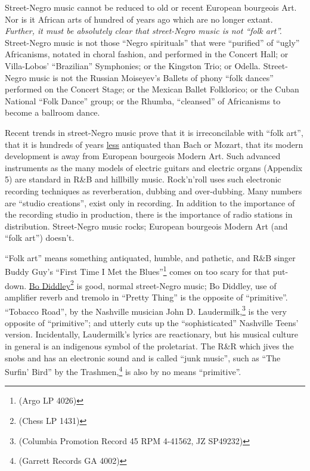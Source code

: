 Street-Negro music cannot be reduced to old or recent European bourgeois Art. 
Nor is it African arts of hundred of years ago which are no longer extant. 
\emph{Further, it must be absolutely clear that street-Negro music is not \enquote{folk art}.}
Street-Negro music is not those \enquote{Negro spirituals} that were \enquote{purified} of 
\enquote{ugly} Africanisms, notated in choral fashion, and performed in the Concert
Hall; or Villa-Lobos' \enquote{Brazilian} Symphonies; or the Kingston Trio; or Odella.
Street-Negro music is not the Russian Moiseyev's Ballets of phony \enquote{folk dances}
performed on the Concert Stage; or the Mexican Ballet Folklorico; or the Cuban
National \enquote{Folk Dance} group; or the Rhumba, \enquote{cleansed} of Africanisms to become
a ballroom dance. 

Recent trends in street-Negro music prove that it is irreconcilable 
with \enquote{folk art}, that it is hundreds of years \uline{less} antiquated than Bach or 
Mozart, that its modern development is away from European bourgeois Modern 
Art. Such advanced instruments as the many models of electric guitars and 
electric organs (Appendix 5) are standard in R\&B and hillbilly music. Rock'n'roll 
uses such electronic recording techniques as reverberation, dubbing
and over-dubbing. Many numbers are \enquote{studio creations}, exist only in recording.
In addition to the importance of the recording studio in production, there 
is the importance of radio stations in distribution. Street-Negro music rocks;
European bourgeois Modern Art (and \enquote{folk art}) doesn't. 

\enquote{Folk art} means something antiquated, humble, and pathetic, and R\&B singer
Buddy Guy's \enquote{First Time I Met the Blues}\footnote{(Argo LP 4026)} comes on too scary for
that put-down. \uline{Bo Diddley}\footnote{(Chess LP 1431)} is good, normal street-Negro music; 
Bo Diddley, use of amplifier reverb and tremolo in \enquote{Pretty Thing} is the 
opposite of \enquote{primitive}. \enquote{Tobacco Road}, by the Nashville musician John D. 
Laudermilk,\footnote{(Columbia Promotion Record 45 RPM 4-41562, JZ SP49232)} is the very 
opposite of \enquote{primitive}; and utterly cuts up the \enquote{sophisticated} Nashville Teens'
version. Incidentally, Laudermilk's lyrics are reactionary, but his musical
culture in general is an indigenous symbol of the proletariat. The R\&R which 
jives the snobs and has an electronic sound and is called \enquote{junk music}, such
as \enquote{The Surfin' Bird} by the Trashmen,\footnote{(Garrett Records GA 4002)} is also
by no means \enquote{primitive}. 

